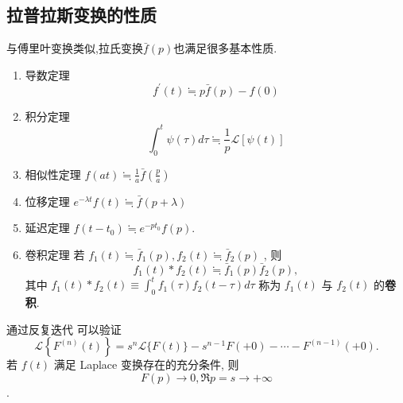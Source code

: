 \subsection{拉普拉斯变换的性质}
与傅里叶变换类似,拉氏变换$\bar{f}(p)$也满足很多基本性质.
\begin{enumerate}
    \item 导数定理
        $$
        f^{\prime}(t) \fallingdotseq  p \bar{f}(p)-f(0)
        $$
    \item 积分定理
        $$
        \int_0^t \psi(\tau) d \tau \fallingdotseq  \frac{1}{p} \mathcal{L}[\psi(t)]
        $$
    \item 相似性定理 $  f(a t) \fallingdotseq  \frac{1}{a} \bar{f}\left(\frac{p}{a}\right)$

    \item 位移定理 $        e^{-\lambda t} f(t) \fallingdotseq  \bar{f}(p+\lambda)$
    \item 延迟定理 $f\left(t-t_0\right) \fallingdotseq  e^{-p t_0} f(p)$.
    \item 卷积定理 若  $f_1(t) \fallingdotseq  \bar{f}_1(p), f_2(t) \fallingdotseq  \bar{f}_2(p)$ , 则 $$f_1(t) * f_2(t) \fallingdotseq  \bar{f}_1(p) \bar{f}_2(p),$$
    其中 $f_1(t) * f_2(t) \equiv \int_0^t f_1(\tau) f_2(t-\tau) d \tau$ 称为 $f_1(t)$ 与 $f_2(t)$ 的\textbf{卷积}.
\end{enumerate}
通过反复迭代
可以验证
$$
\mathcal{L}\left\{F^{(n)}(t)\right\}=s^n \mathcal{L}\{F(t)\}-s^{n-1} F(+0)-\cdots-F^{(n-1)}(+0) .
$$
若 $f(t)$ 满足 Laplace 变换存在的充分条件, 则
$$F(p) \rightarrow 0, \Re p=s \rightarrow+\infty$$.



